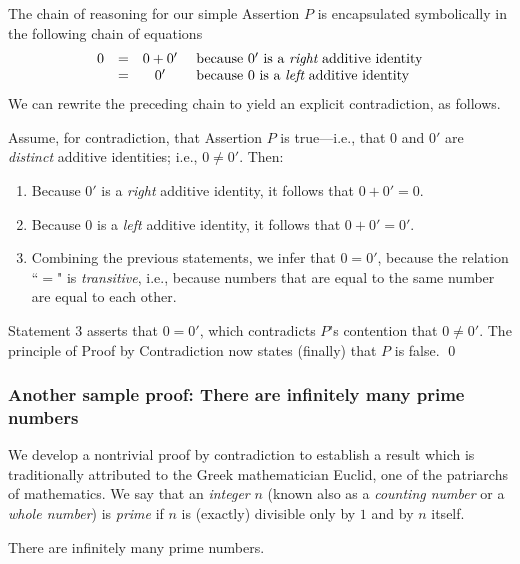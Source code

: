 \smallskip

The chain of reasoning for our simple Assertion $P$ is encapsulated symbolically in the following chain of equations
\[
\begin{array}{cccl}
 0 & = & 0 + 0' & \mbox{ because $0'$ is a {\em right} additive identity} \\
   & = & 0' & \mbox{ because $0$ is a {\em left} additive identity}
\end{array}
\]
We can rewrite the preceding chain to yield an explicit contradiction, as follows.

\medskip

Assume, for contradiction, that Assertion $P$ is true---i.e., that $0$ and $0'$ are {\em distinct} additive identities; i.e., $0 \neq 0'$.  Then:
\begin{enumerate}
\item
Because $0'$ is a {\em right} additive identity, it follows that $0 + 0' = 0$.
\medskip\item
Because $0$ is a {\em left} additive identity, it follows that $0 + 0' = 0'$.
\medskip\item
Combining the previous statements, we infer that $0 = 0'$, because the relation ``$=$" is {\em transitive}, i.e., because numbers that are equal to the same number are equal to each other.
\end{enumerate}
Statement 3 asserts that $0 = 0'$, which contradicts $P$'s contention that $0 \neq 0'$.   The principle of Proof by Contradiction now states (finally) that $P$ is false. \qed

\subsubsection{Another sample proof: There are infinitely many prime numbers}
\label{sec:sample-contradictions}

 
We develop a nontrivial proof by contradiction to establish a result which is traditionally attributed to the Greek mathematician Euclid, one of the patriarchs of mathematics.  We say that an {\it integer} $n$ (known also as a {\it counting number} or a {\it whole number}) is {\it prime} if $n$ is (exactly) divisible only by $1$ and by $n$ itself.

\begin{prop}
\label{thm:Primes-infinite}
There are infinitely many prime numbers.
\end{prop}

